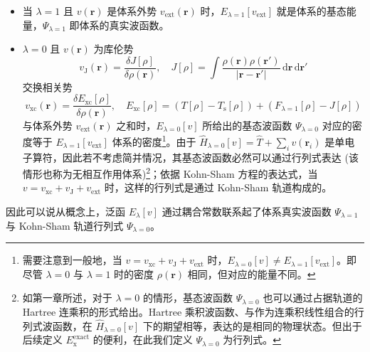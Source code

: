 \begin{itemize}[nosep]
  \item 当 $\lambda = 1$ 且 $v(\bm{r})$ 是体系外势 $v_\mathrm{ext} (\bm{r})$ 时，$E_{\lambda=1} [v_\mathrm{ext}]$ 就是体系的基态能量，$\Psi_{\lambda=1}$ 即体系的真实波函数。

  \item $\lambda = 0$ 且 $v(\bm{r})$ 为库伦势
  $$v_\mathrm{J} (\bm{r}) = \frac{\delta J[\rho]}{\delta \rho(\bm{r})}, \quad J[\rho] = \int \frac{\rho(\bm{r}) \rho(\bm{r}')}{|\bm{r} - \bm{r}'|} \, \mathrm{d} \bm{r} \, \mathrm{d} \bm{r}'$$
  交换相关势
  \begin{equation*}
    v_\mathrm{xc} (\bm{r}) = \frac{\delta E_\mathrm{xc}[\rho]}{\delta \rho(\bm{r})}, \quad E_\mathrm{xc} [\rho] = (T[\rho] - T_\mathrm{s} [\rho]) + (F_{\lambda=1} [\rho] - J[\rho])
  \end{equation*}
  与体系外势 $v_\mathrm{ext} (\bm{r})$ 之和时，$E_{\lambda=0} [v]$ 所给出的基态波函数 $\Psi_{\lambda=0}$ 对应的密度等于 $E_{\lambda=1} [v_\mathrm{ext}]$ 体系的密度\footnote{需要注意到一般地，当 $v = v_\mathrm{xc} + v_\mathrm{J} + v_\mathrm{ext}$ 时，$E_{\lambda=0} [v] \neq E_{\lambda=1} [v_\mathrm{ext}]$。即尽管 $\lambda = 0$ 与 $\lambda = 1$ 时的密度 $\rho(\bm{r})$ 相同，但对应的能量不同。}。由于 $\hat H_{\lambda=0} [v] = \hat T + \sum_{i} v(\bm{r}_i)$ 是单电子算符，因此若不考虑简并情况，其基态波函数必然可以通过行列式表达 (该情形也称为无相互作用体系)\footnote{如第一章所述，对于 $\lambda = 0$ 的情形，基态波函数 $\Psi_{\lambda = 0}$ 也可以通过占据轨道的 Hartree 连乘积的形式给出。Hartree 乘积波函数、与作为连乘积线性组合的行列式波函数，在 $\hat H_{\lambda=0} [v]$ 下的期望相等，表达的是相同的物理状态。但出于后续定义 $E_\mathrm{x}^\text{exact}$ 的便利，在此我们定义 $\Psi_{\lambda = 0}$ 为行列式。}；依据 Kohn-Sham 方程的表达式，当 $v = v_\mathrm{xc} + v_\mathrm{J} + v_\mathrm{ext}$ 时，这样的行列式是通过 Kohn-Sham 轨道构成的。
\end{itemize}
因此可以说从概念上，泛函 $E_\lambda [v]$ 通过耦合常数联系起了体系真实波函数 $\Psi_{\lambda = 1}$ 与 Kohn-Sham 轨道行列式 $\Psi_{\lambda = 0}$。

